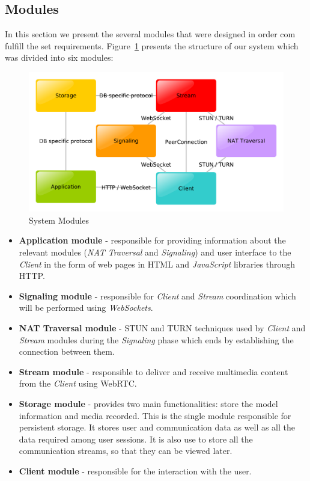 \documentclass[conference,compsoc,a4paper]{IEEEtran}
\begin{document}
\subsection{Modules}
In this section we present the several modules that were designed in order com fulfill the set requirements.
	Figure~\ref{fig:modules} presents the structure of our system which was divided into six modules:


\begin{figure}
	\centering
	\includegraphics[width=\linewidth]{figures/modules.pdf}
	\caption{System Modules}
    \label{fig:modules}
\end{figure}



\begin{itemize}

\item \textbf{Application module} - responsible for providing information about the relevant modules (\emph{NAT Traversal} and \emph{Signaling}) and user interface to the \emph{Client} in the form of web pages in \gls{HTML} and \emph{JavaScript} libraries through \gls{HTTP}.
 
\item \textbf{Signaling module} - responsible for \emph{Client} and \emph{Stream} coordination which will be performed using \emph{WebSockets}.

 \item \textbf{NAT Traversal module} - \gls{STUN} and \gls{TURN} techniques used by \emph{Client} and \emph{Stream} modules during the \emph{Signaling} phase which ends by establishing the connection between them.

 \item \textbf{Stream module} - responsible to deliver and receive multimedia content from the \emph{Client} using \gls{WebRTC}. 

 \item \textbf{Storage module} - provides two main functionalities: store the model information and media recorded. This is the single module responsible for persistent storage. It stores user and communication data as well as all the data required among user sessions. It is also use to store all the communication streams, so that they can be viewed later.

 \item \textbf{Client module} - responsible for the interaction with the user.

\end{itemize}
\end{document}
